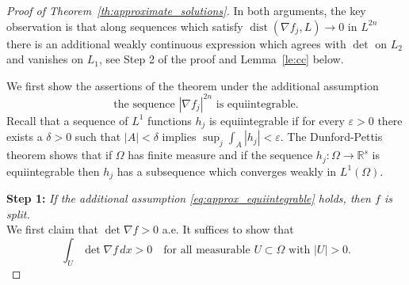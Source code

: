 \documentclass[titlepage]{amsart}
\numberwithin{equation}{section}
\theoremstyle{plain}
\theoremstyle{definition}
\theoremstyle{remark}
\newcommand{\dist}{\operatorname{dist}}
\newcommand{\eps}{\varepsilon}
\newcommand{\R}{\mathbb{R}}
\newcommand{\g}{\nabla }
\begin{document}
\begin{proof}[Proof of Theorem~\ref{th:approximate_solutions}]
In both arguments, the  key observation is that along sequences which satisfy $\dist(\g f_j, L) \to 0$ in $L^{2n}$ there is an   additional
weakly continuous expression which agrees with $\det$ on $L_2$ and vanishes on $L_1$, see Step 2 of the proof and  Lemma~\ref{le:cc}  below.

We first show the assertions of the theorem under the additional assumption
\begin{equation}  \label{eq:approx_equiintegrable}
\text{the sequence  $|\g f_j|^{2n}$ is equiintegrable.} 
\end{equation}
Recall that  a  sequence of $L^1$ functions $h_j$ is equiintegrable if for every $\eps > 0$ there exists a
$\delta > 0$ such that $|A| < \delta$ implies $\sup_j \int_A |h_j| < \eps$. The Dunford-Pettis theorem shows that
if $\Omega$ has finite measure  and if the sequence  $h_j: \Omega \to \R^s$ is equiintegrable then $h_j$ has a subsequence which converges
weakly  in $L^1(\Omega)$. 

{\bf Step 1:} \emph{If the additional assumption  \eqref{eq:approx_equiintegrable} holds, then $f$ is split.}\\
We first claim that $\det \g f > 0$ a.e.
  It suffices to show that 
 \begin{equation}  \label{eq:criterion_det_positive}
 \int_U \det \g f \, dx > 0 \quad \text{for all measurable $U \subset \Omega$ with $|U| > 0$.}
 \end{equation}


\end{proof}
\end{document}
